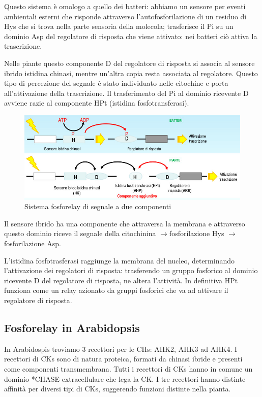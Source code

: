 \documentclass[a4paper,12pt]{book}
\newcommand{\lfreccia}{\ensuremath{\longrightarrow}}
\begin{document}
Questo sistema è omologo a quello dei batteri: abbiamo un sensore per eventi ambientali esterni che risponde attraverso l'autofosforilazione di un residuo di Hys che si trova nella parte sensoria della molecola; trasferisce il Pi su un dominio Asp del regolatore di risposta che viene attivato: nei batteri ciò attiva la trascrizione.

Nelle piante questo componente D del regolatore di risposta si associa al sensore ibrido istidina chinasi, mentre un'altra copia resta associata al regolatore. Questo tipo di percezione del segnale è stato individuato nelle citochine e porta all'attivazione della trascrizione. Il trasferimento del Pi al dominio ricevente D avviene razie al componente HPt (istidina fosfotransferasi).
\begin{figure}[H]
\centering
\includegraphics[scale=0.4]{immagini/sensore.jpg}
\caption{Sistema fosforelay di segnale a due componenti}
\end{figure}

Il sensore ibrido ha una componente che attraversa la membrana e attraverso questo dominio riceve il segnale della citochinina \lfreccia fosforilazione Hys \lfreccia fosforilazione Asp.

L'istidina fosfotrasferasi raggiunge la membrana del nucleo, determinando l'attivazione dei regolatori di risposta:  trasferendo un gruppo fosforico al dominio ricevente D del regolatore di risposta, ne altera
l’attività. In definitiva HPt funziona come un relay azionato da gruppi fosforici che va ad attivare il regolatore di
risposta.

\subsection{Fosforelay in Arabidopsis}
In Arabidospis troviamo 3 recettori per le CHs: AHK2, AHK3 ad AHK4. I recettori di CKs sono di natura proteica, formati da chinasi ibride e presenti come componenti transmembrana. Tutti i
recettori di CKs hanno in comune un dominio *CHASE extracellulare che lega la CK. I tre recettori hanno distinte affinità
per diversi tipi di CKs, suggerendo funzioni distinte nella pianta.
\end{document}

